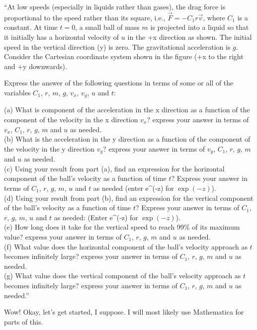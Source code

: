 \documentclass[8.01x]{subfiles}
\begin{document}
``At low speeds (especially in liquids rather than gases), the drag force is proportional to the speed rather than its square, i.e., $\vec{F} = -C_1 r \vec{v}$, where $C_1$ is a constant. At time $t = 0$, a small ball of mass $m$ is projected into a liquid so that it initially has a horizontal velocity of $u$ in the +x direction as shown. The initial speed in the vertical direction (y) is zero. The gravitational acceleration is $g$. Consider the Cartesian coordinate system shown in the figure (+x to the right and +y downwards).

Express the answer of the following questions in terms of some or all of the variables $C_1$, $r$, $m$, $g$, $v_x$, $v_y$, $u$ and $t$:

(a) What is component of the acceleration in the x direction as a function of the component of the velocity in the x direction $v_x$? express your answer in terms of $v_x$, $C_1$, $r$, $g$, $m$ and $u$ as needed.\\
(b) What is the acceleration in the y direction as a function of the component of the velocity in the y direction $v_y$? express your answer in terms of $v_y$, $C_1$, $r$, $g$, $m$ and $u$ as needed.\\
(c) Using your result from part (a), find an expression for the horizontal component of the ball's velocity as a function of time $t$? Express your answer in terms of $C_1$, $r$, $g$, $m$, $u$ and $t$ as needed (enter e\textasciicircum(-z) for $\exp(-z)$).\\
(d) Using your result from part (b), find an expression for the vertical component of the ball's velocity as a function of time $t$? Express your answer in terms of $C_1$, $r$, $g$, $m$, $u$ and $t$ as needed: (Enter e\textasciicircum(-z) for $\exp(-z)$).\\
(e) How long does it take for the vertical speed to reach 99\% of its maximum value? express your answer in terms of $C_1$, $r$, $g$, $m$ and $u$ as needed.\\
(f) What value does the horizontal component of the ball's velocity approach as $t$ becomes infinitely large? express your answer in terms of $C_1$, $r$, $g$, $m$ and $u$ as needed.\\
(g) What value does the vertical component of the ball's velocity approach as $t$ becomes infinitely large? express your answer in terms of $C_1$, $r$, $g$, $m$ and $u$ as needed.''

Wow! Okay, let's get started, I suppose. I will most likely use Mathematica for parts of this.
\end{document}
